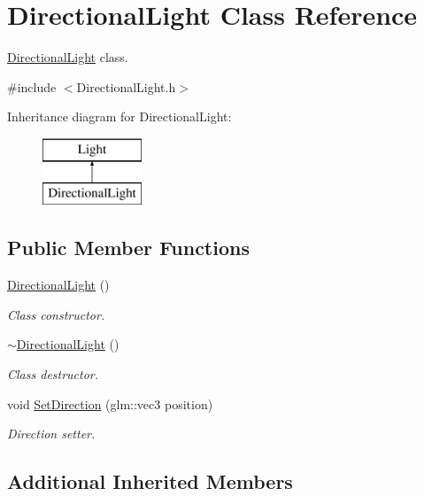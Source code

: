 \hypertarget{class_directional_light}{}\section{Directional\+Light Class Reference}
\label{class_directional_light}


\hyperlink{class_directional_light}{Directional\+Light} class.  




{\ttfamily \#include $<$Directional\+Light.\+h$>$}

Inheritance diagram for Directional\+Light\+:\begin{figure}[H]
\begin{center}
\leavevmode
\includegraphics[height=2.000000cm]{class_directional_light}
\end{center}
\end{figure}
\subsection*{Public Member Functions}
\begin{DoxyCompactItemize}
\item 
\hyperlink{class_directional_light_a949b877ae041b9818f47eb812d80fa1b}{Directional\+Light} ()
\begin{DoxyCompactList}\small\item\em Class constructor. \end{DoxyCompactList}\item 
\hyperlink{class_directional_light_ac4aca6c806e752c65ffea9b2f237b245}{$\sim$\+Directional\+Light} ()
\begin{DoxyCompactList}\small\item\em Class destructor. \end{DoxyCompactList}\item 
void \hyperlink{class_directional_light_afdd5ff26965bdc32a0254af59332afd5}{Set\+Direction} (glm\+::vec3 position)
\begin{DoxyCompactList}\small\item\em Direction setter. \end{DoxyCompactList}\end{DoxyCompactItemize}
\subsection*{Additional Inherited Members}


